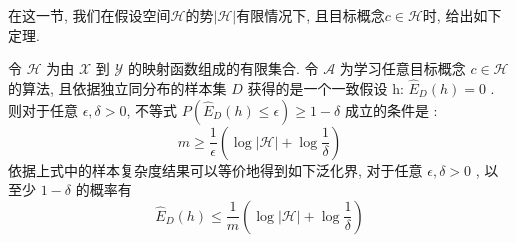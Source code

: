 在这一节, 我们在假设空间$\mathcal{H}$的势$|\mathcal{H}|$有限情况下, 且目标概念$c \in \mathcal{H}$时, 给出如下定理. 

\begin{theorem}
令 $\mathcal{H}$ 为由 $\mathcal{X}$ 到 $\mathcal{Y}$ 的映射函数组成的有限集合. 令 $\mathcal{A}$ 为学习任意目标概念 $c \in \mathcal{H}$ 的算法, 且依据独立同分布的样本集 $D$ 获得的是一个一致假设 h: $\hat{E}_D(h)=0$ . 则对于任意 $\epsilon,\delta >0$, 不等式  $P(\hat{E}_D(h)\le\epsilon)\ge 1-\delta $ 成立的条件是 :
\begin{equation}
m\ge \frac{1}{\epsilon}\left( \log \left| \mathcal{H} \right|+\log \frac{1}{\delta} \right)
\end{equation}
依据上式中的样本复杂度结果可以等价地得到如下泛化界, 对于任意  $\epsilon,\delta >0$ , 以至少 $1-\delta$ 的概率有
\begin{equation}
\hat{E}_D(h) \le \frac{1}{m}\left( \log \left| \mathcal{H} \right|+\log \frac{1}{\delta} \right)
\end{equation}
\end{theorem}

